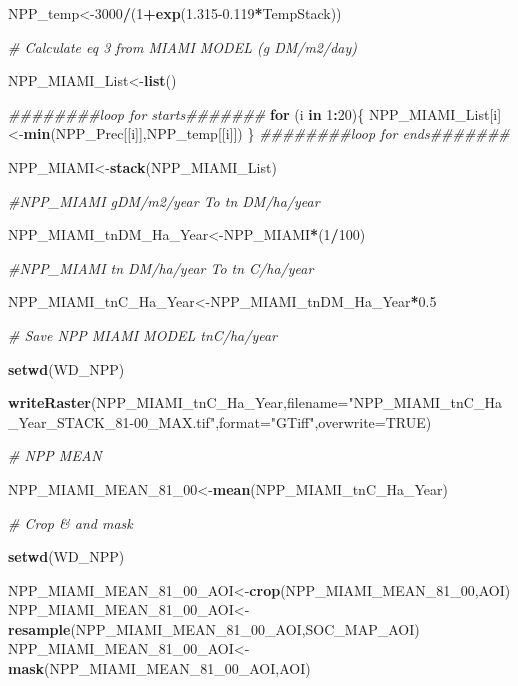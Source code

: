 \documentclass[
  10pt,
  b5paper,
]{book}
\newenvironment{Shaded}{\begin{snugshade}}{\end{snugshade}}
\newcommand{\CommentTok}[1]{\textcolor[rgb]{0.56,0.35,0.01}{\textit{#1}}}
\newcommand{\ControlFlowTok}[1]{\textcolor[rgb]{0.13,0.29,0.53}{\textbf{#1}}}
\newcommand{\DataTypeTok}[1]{\textcolor[rgb]{0.13,0.29,0.53}{#1}}
\newcommand{\DecValTok}[1]{\textcolor[rgb]{0.00,0.00,0.81}{#1}}
\newcommand{\FloatTok}[1]{\textcolor[rgb]{0.00,0.00,0.81}{#1}}
\newcommand{\KeywordTok}[1]{\textcolor[rgb]{0.13,0.29,0.53}{\textbf{#1}}}
\newcommand{\NormalTok}[1]{#1}
\newcommand{\OperatorTok}[1]{\textcolor[rgb]{0.81,0.36,0.00}{\textbf{#1}}}
\newcommand{\OtherTok}[1]{\textcolor[rgb]{0.56,0.35,0.01}{#1}}
\newcommand{\StringTok}[1]{\textcolor[rgb]{0.31,0.60,0.02}{#1}}
\begin{document}
\begin{Shaded}
\begin{Highlighting}[]
\NormalTok{NPP_temp<-}\DecValTok{3000}\OperatorTok{/}\NormalTok{(}\DecValTok{1}\OperatorTok{+}\KeywordTok{exp}\NormalTok{(}\FloatTok{1.315-0.119}\OperatorTok{*}\NormalTok{TempStack))}

\CommentTok{# Calculate eq 3 from MIAMI MODEL (g DM/m2/day)}

\NormalTok{NPP_MIAMI_List<-}\KeywordTok{list}\NormalTok{()}

\CommentTok{########loop for starts#######}
\ControlFlowTok{for}\NormalTok{ (i }\ControlFlowTok{in} \DecValTok{1}\OperatorTok{:}\DecValTok{20}\NormalTok{)\{}
\NormalTok{NPP_MIAMI_List[i]<-}\KeywordTok{min}\NormalTok{(NPP_Prec[[i]],NPP_temp[[i]])}
\NormalTok{\}}
\CommentTok{########loop for ends#######}


\NormalTok{NPP_MIAMI<-}\KeywordTok{stack}\NormalTok{(NPP_MIAMI_List)}

\CommentTok{#NPP_MIAMI gDM/m2/year To tn DM/ha/year}

\NormalTok{NPP_MIAMI_tnDM_Ha_Year<-NPP_MIAMI}\OperatorTok{*}\NormalTok{(}\DecValTok{1}\OperatorTok{/}\DecValTok{100}\NormalTok{)}

\CommentTok{#NPP_MIAMI tn DM/ha/year To tn C/ha/year}

\NormalTok{NPP_MIAMI_tnC_Ha_Year<-NPP_MIAMI_tnDM_Ha_Year}\OperatorTok{*}\FloatTok{0.5}

\CommentTok{# Save NPP MIAMI MODEL tnC/ha/year}

\KeywordTok{setwd}\NormalTok{(WD_NPP)}

\KeywordTok{writeRaster}\NormalTok{(NPP_MIAMI_tnC_Ha_Year,}\DataTypeTok{filename=}\StringTok{"NPP_MIAMI_tnC_Ha_Year_STACK_81-00_MAX.tif"}\NormalTok{,}\DataTypeTok{format=}\StringTok{"GTiff"}\NormalTok{,}\DataTypeTok{overwrite=}\OtherTok{TRUE}\NormalTok{)}

\CommentTok{# NPP MEAN}

\NormalTok{NPP_MIAMI_MEAN_}\DecValTok{81}\NormalTok{_}\DecValTok{00}\NormalTok{<-}\KeywordTok{mean}\NormalTok{(NPP_MIAMI_tnC_Ha_Year)}

\CommentTok{# Crop & and mask}

\KeywordTok{setwd}\NormalTok{(WD_NPP)}

\NormalTok{NPP_MIAMI_MEAN_}\DecValTok{81}\NormalTok{_}\DecValTok{00}\NormalTok{_AOI<-}\KeywordTok{crop}\NormalTok{(NPP_MIAMI_MEAN_}\DecValTok{81}\NormalTok{_}\DecValTok{00}\NormalTok{,AOI)}
\NormalTok{NPP_MIAMI_MEAN_}\DecValTok{81}\NormalTok{_}\DecValTok{00}\NormalTok{_AOI<-}\KeywordTok{resample}\NormalTok{(NPP_MIAMI_MEAN_}\DecValTok{81}\NormalTok{_}\DecValTok{00}\NormalTok{_AOI,SOC_MAP_AOI)}
\NormalTok{NPP_MIAMI_MEAN_}\DecValTok{81}\NormalTok{_}\DecValTok{00}\NormalTok{_AOI<-}\KeywordTok{mask}\NormalTok{(NPP_MIAMI_MEAN_}\DecValTok{81}\NormalTok{_}\DecValTok{00}\NormalTok{_AOI,AOI)}


\end{Highlighting}
\end{Shaded}
\end{document}
